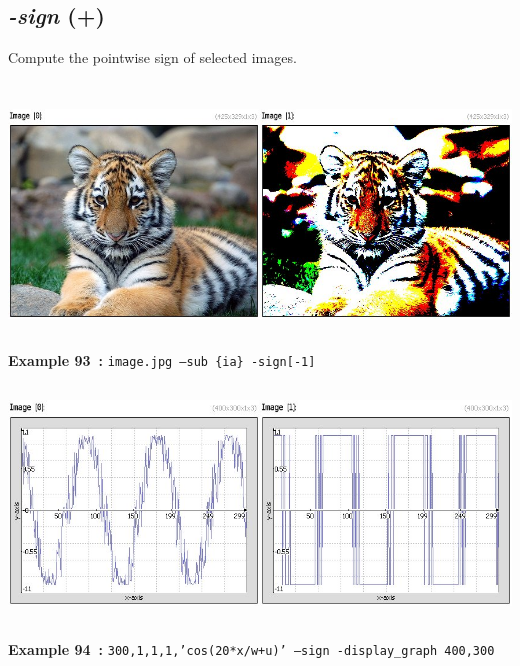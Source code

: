 \documentclass[a4paper,11pt,twoside]{book}
\begin{document}
\subsection{\emph{-sign} (+)}\vspace*{-0.5em}
Compute the pointwise sign of selected images.
\begin{center}\includegraphics[keepaspectratio=true,height=7cm,width=\textwidth]{img/gmic_def93.jpg}\\
{\footnotesize \textbf{Example 93~:} \texttt{image.jpg --sub \{ia\} -sign[-1]}}
\\\includegraphics[keepaspectratio=true,height=7cm,width=\textwidth]{img/gmic_def94.jpg}\\
{\footnotesize \textbf{Example 94~:} \texttt{300,1,1,1,'cos(20*x/w+u)' --sign -display\_graph 400,300}}
\end{center}
\end{document}

